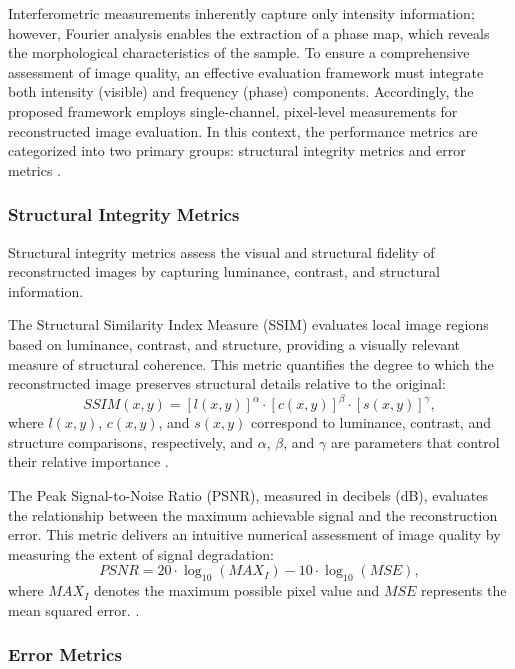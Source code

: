 \documentclass[10pt,twocolumn]{article}
\begin{document}
Interferometric measurements inherently capture only intensity information; however, Fourier analysis enables the extraction of a phase map, which reveals the morphological characteristics of the sample. To ensure a comprehensive assessment of image quality, an effective evaluation framework must integrate both intensity (visible) and frequency (phase) components. Accordingly, the proposed framework employs single-channel, pixel-level measurements for reconstructed image evaluation. In this context, the performance metrics are categorized into two primary groups: structural integrity metrics and error metrics \cite{Arabboev2024}.

\subsubsection{Structural Integrity Metrics}

Structural integrity metrics assess the visual and structural fidelity of reconstructed images by capturing luminance, contrast, and structural information.

The Structural Similarity Index Measure (SSIM) evaluates local image regions based on luminance, contrast, and structure, providing a visually relevant measure of structural coherence. This metric quantifies the degree to which the reconstructed image preserves structural details relative to the original:
\begin{equation}
SSIM(x,y) = [l(x,y)]^\alpha \cdot [c(x,y)]^\beta \cdot [s(x,y)]^\gamma,
\end{equation}
where \( l(x,y) \), \( c(x,y) \), and \( s(x,y) \) correspond to luminance, contrast, and structure comparisons, respectively, and \( \alpha \), \( \beta \), and \( \gamma \) are parameters that control their relative importance \cite{Arabboev2024}.

The Peak Signal-to-Noise Ratio (PSNR), measured in decibels (dB), evaluates the relationship between the maximum achievable signal and the reconstruction error. This metric delivers an intuitive numerical assessment of image quality by measuring the extent of signal degradation:
\begin{equation}
PSNR = 20 \cdot \log_{10}(MAX_I) - 10 \cdot \log_{10}(MSE),
\end{equation}
where \( MAX_I \) denotes the maximum possible pixel value and \( MSE \) represents the mean squared error. \cite{Arabboev2024}.

\subsubsection{Error Metrics}
\end{document}
